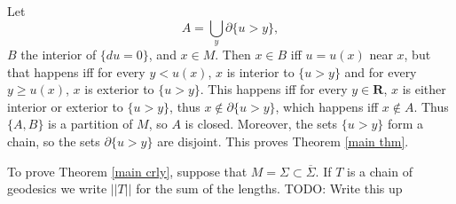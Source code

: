 \documentclass[reqno,12pt,letterpaper]{amsart}
\newcommand{\RR}{\mathbf{R}}
\theoremstyle{definition}
\numberwithin{equation}{section}
\begin{document}
Let
\begin{equation}\label{lamination union}
A = \bigcup_y \partial \{u > y\},
\end{equation} $B$ the interior of $\{du = 0\}$, and $x \in M$.
Then $x \in B$ iff $u = u(x)$ near $x$, but that happens iff for every $y < u(x)$, $x$ is interior to $\{u > y\}$ and for every $y \geq u(x)$, $x$ is exterior to $\{u > y\}$.
This happens iff for every $y \in \RR$, $x$ is either interior or exterior to $\{u > y\}$, thus $x \notin \partial \{u > y\}$, which happens iff $x \notin A$.
Thus $\{A, B\}$ is a partition of $M$, so $A$ is closed.
Moreover, the sets $\{u > y\}$ form a chain, so the sets $\partial \{u > y\}$ are disjoint.
This proves Theorem \ref{main thm}.

To prove Theorem \ref{main crly}, suppose that $M = \Sigma \subset \overline \Sigma$.
If $T$ is a chain of geodesics we write $||T||$ for the sum of the lengths.
TODO: Write this up
\end{document}
